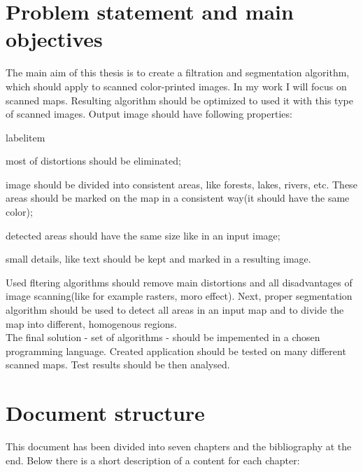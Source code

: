 \documentclass[a4paper,onecolumn,oneside,12pt]{memoir}
\makeatletter
\renewenvironment{itemize}{
  \begin{list}{  
  \csname labelitem\romannumeral\the\@listdepth\endcsname}{
  \setlength{\leftmargin}{1em}
	\setlength{\topsep}{6pt}%
	\setlength{\partopsep}{0pt}%
	\setlength{\parskip}{0pt}%
	\setlength{\parsep}{0pt}%
	\setlength{\itemsep}{0pt}}
}{
  \end{list}
}
\makeatother
\begin{document}
\section{Problem statement and main objectives}

The main aim of this thesis is to create a filtration and segmentation algorithm, which should
apply to scanned color-printed images. In my work I will focus on scanned maps. 
Resulting algorithm should be optimized to used it with this type of scanned images. 
Output image should have following properties:

\begin{itemize}
  \item most of distortions should be eliminated;
  \item image should be divided into consistent areas, like forests, lakes, rivers, etc. These areas should
        be marked on the map in a consistent way(it should have the same color);
  \item detected areas should have the same size like in an input image;
  \item small details, like text should be kept and marked in a resulting image.
\end{itemize}

Used fltering algorithms should remove main distortions and all disadvantages of image scanning(like for example
rasters, moro effect). Next, proper segmentation algorithm should be used to detect all areas in an input map
and to divide the map into different, homogenous regions. \\

The final solution - set of algorithms - should be impemented in a chosen programming language. Created application
should be tested on many different scanned maps. Test results should be then analysed.

\section{Document structure}

This document has been divided into seven chapters and the bibliography at the end.
Below there is a short description of a content for each chapter:

\end{document}
